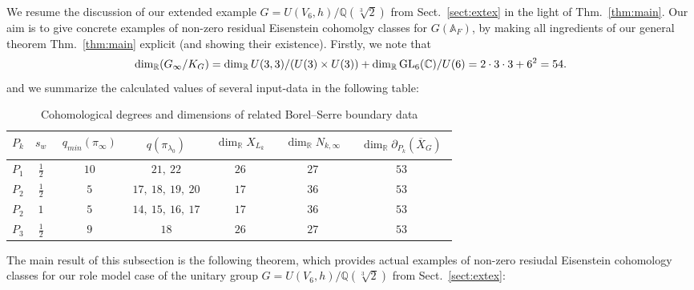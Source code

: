 \documentclass[a4paper,10pt]{amsart}
\theoremstyle{definition}
\numberwithin{equation}{section}
\def\A{\mathbb A}
\def\Q{\mathbb Q}
\def\GL{{\rm GL}}
\begin{document}
We resume the discussion of our extended example $G=U(V_6,h)/\Q(\sqrt[3]{2})$ from Sect.\ \ref{sect:extex} in the light of Thm.\ \ref{thm:main}. Our aim is to give concrete examples of non-zero residual Eisenstein cohomolgy classes for $G(\A_F)$, by making all ingredients of our general theorem Thm.\ \ref{thm:main} explicit (and showing their existence). Firstly, we note that
$$
\dim_\mathbb R(G_\infty/K_G)
=
\dim_\mathbb R U(3,3)/ (U(3)\times U(3))
+
\dim_\mathbb R \GL_6(\mathbb C)/U(6)
=
2\cdot 3\cdot 3+6^2
=
54.
$$
and we summarize the calculated values of several input-data in the following table:
\begin{table}[ht]
\centering
\small
\renewcommand{\arraystretch}{1.2}
\begin{tabular}{c|c|c|c|c|c|c}
\hline
\(P_k\)
&
\(s_w\)
&
\(\begin{array}{c} q_{min}(\pi_\infty) \end{array}\)
&
\(\begin{array}{c} q(\pi_{\lambda_0}) \end{array}\)
&
\(\begin{array}{c} \dim_\mathbb R X_{L_k} \end{array}\)
&
\(\begin{array}{c} \dim_\mathbb R N_{k,\infty} \end{array}\)
&
\(\begin{array}{c} \dim_\mathbb R \partial_{P_k}(\overline X_G) \end{array}\)
\\
\hline
\(P_1\) & \(\frac12\) & \(10\) & \(21,\ 22\)             & \(26\) & \(27\) & \(53\)\\
\(P_2\) & \(\frac12\) & \(5\)  & \(17,\ 18,\ 19,\ 20\)   & \(17\) & \(36\) & \(53\)\\
\(P_2\) & \(1\)       & \(5\)  & \(14,\ 15,\ 16,\ 17\)   & \(17\) & \(36\) & \(53\)\\
\(P_3\) & \(\frac12\) & \(9\)  & \(18\)                  & \(26\) & \(27\) & \(53\)\\
\hline
\end{tabular}
\caption{Cohomological degrees and dimensions of related Borel--Serre boundary data}
\label{tab:example-degrees-boundary}
\end{table}



The main result of this subsection is the following theorem, which provides actual examples of non-zero resiudal Eisenstein cohomology classes for our role model case of the unitary group $G=U(V_6,h)/\Q(\sqrt[3]{2})$ from Sect.\ \ref{sect:extex}:
\end{document}
